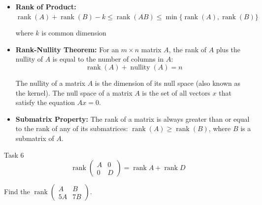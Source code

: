 \documentclass[fullscreen=true, bookmarks=true, hyperref={pdfencoding=unicode}]{beamer}
\begin{document}
\begin{frame}
\begin{itemize}  
  \item \textbf{Rank of Product:} $\operatorname{rank}(A) + \operatorname{rank}(B) - k \le \operatorname{rank}(AB) \le \min\{\operatorname{rank}(A), \operatorname{rank}(B)\}$
  
  where $k$ is common dimension
  \pause    
  \item \textbf{Rank-Nullity Theorem:} For an $m \times n$ matrix $A$, 
  the rank of $A$ plus the nullity of $A$ is equal to the number of 
  columns in $A$: $$\operatorname{rank}(A) + \operatorname{nullity}(A) = n$$
  
  {\small The nullity of a matrix $A$ is the dimension of its null space 
  (also known as the kernel). The null space of a matrix $A$ is the set of 
  all vectors $x$ that satisfy the equation $Ax = 0$.}
  
  \pause    
  \item \textbf{Submatrix Property:} The rank of a matrix is always greater than or equal to the rank of any of its submatrices: $\operatorname{rank}(A) \geq \operatorname{rank}(B)$, where $B$ is a submatrix of $A$.
\end{itemize}  

\end{frame}


\begin{frame}{Task 6}
  $$\operatorname{rank}\begin{pmatrix}
    A & 0 \\
    0 & D
  \end{pmatrix} = 
  \operatorname{rank}A + \operatorname{rank}D$$

  \vspace{1cm}
  Find the $\operatorname{rank}\begin{pmatrix}
    A & B \\
    5A & 7B
  \end{pmatrix}$.
\end{frame}
\end{document}
